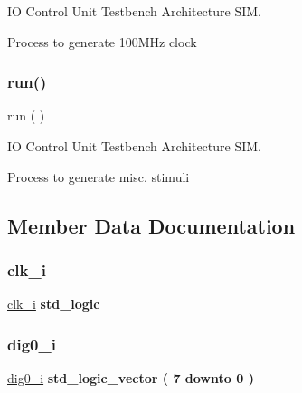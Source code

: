 IO Control Unit Testbench Architecture S\+IM. 

Process to generate 100\+M\+Hz clock \mbox{\label{classtb__io__ctrl_1_1sim_a0f40b896b2461e250ebafd4e27b8ff54}} 
\subsubsection{\texorpdfstring{run()}{run()}}
{\footnotesize\ttfamily  {\bfseries \textcolor{vhdlchar}{ }} run ( ) \hspace{0.3cm}{\ttfamily [Process]}}



IO Control Unit Testbench Architecture S\+IM. 

Process to generate misc. stimuli 

\subsection{Member Data Documentation}
\mbox{\label{classtb__io__ctrl_1_1sim_a51bcb92d1464ea7874528ced3e160ff1}} 
\subsubsection{\texorpdfstring{clk\+\_\+i}{clk\_i}}
{\footnotesize\ttfamily \hyperlink{classtb__io__ctrl_1_1sim_a51bcb92d1464ea7874528ced3e160ff1}{clk\+\_\+i} {\bfseries \textcolor{comment}{std\+\_\+logic}\textcolor{vhdlchar}{ }} \hspace{0.3cm}{\ttfamily [Signal]}}

\mbox{\label{classtb__io__ctrl_1_1sim_a86f89d036a0d85bd49bf94aa4240b666}} 
\subsubsection{\texorpdfstring{dig0\+\_\+i}{dig0\_i}}
{\footnotesize\ttfamily \hyperlink{classtb__io__ctrl_1_1sim_a86f89d036a0d85bd49bf94aa4240b666}{dig0\+\_\+i} {\bfseries \textcolor{comment}{std\+\_\+logic\+\_\+vector}\textcolor{vhdlchar}{ }\textcolor{vhdlchar}{(}\textcolor{vhdlchar}{ }\textcolor{vhdlchar}{ } \textcolor{vhdldigit}{7} \textcolor{vhdlchar}{ }\textcolor{keywordflow}{downto}\textcolor{vhdlchar}{ }\textcolor{vhdlchar}{ } \textcolor{vhdldigit}{0} \textcolor{vhdlchar}{ }\textcolor{vhdlchar}{)}\textcolor{vhdlchar}{ }} \hspace{0.3cm}{\ttfamily [Signal]}}

